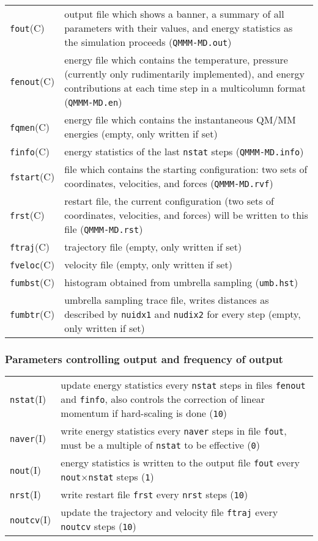 \documentclass[12pt,a4paper]{article}
\newcommand{\Option}[1]{\texttt{#1}}
\newcommand{\OptionValue}[1]{\texttt{#1}}
\begin{document}
\begin{tabularx}{\columnwidth}{p{}X}
  \Option{fout}(C) & output file which shows a banner, a summary of all
  parameters with their values, and energy statistics as the simulation
  proceeds (\OptionValue{QMMM-MD.out}) \\
  \Option{fenout}(C) & energy file which contains the temperature, pressure
  (currently only rudimentarily implemented), and energy contributions at each
  time step in a multicolumn format
  (\OptionValue{QMMM-MD.en}) \\
  \Option{fqmen}(C) & energy file which contains the instantaneous QM/MM
  energies (empty, only written if set) \\
  \Option{finfo}(C) & energy statistics of the last \Option{nstat} steps
  (\OptionValue{QMMM-MD.info}) \\
  \Option{fstart}(C) & file which contains the starting configuration: two sets
  of coordinates, velocities, and forces (\OptionValue{QMMM-MD.rvf}) \\
  \Option{frst}(C) & restart file, the current configuration (two sets of
  coordinates, velocities, and forces) will be written to this file
  (\OptionValue{QMMM-MD.rst}) \\
  \Option{ftraj}(C) & trajectory file (empty, only written if set) \\
  \Option{fveloc}(C) & velocity file (empty, only written if set) \\
  \Option{fumbst}(C) & histogram obtained from umbrella sampling
  (\OptionValue{umb.hst}) \\
  \Option{fumbtr}(C) & umbrella sampling trace file, writes distances as
  described by \Option{nuidx1} and \Option{nudix2} for every step (empty, only
  written if set) \\
\end{tabularx}


\subsubsection*{Parameters controlling output and frequency of output}

\begin{tabularx}{\columnwidth}{p{}X}
  \Option{nstat}(I) & update energy statistics every \Option{nstat} steps in
  files \Option{fenout} and \Option{finfo}, also controls the correction of
  linear momentum if hard-scaling is done (\OptionValue{10}) \\
  \Option{naver}(I) & write energy statistics every \Option{naver} steps in
  file \Option{fout}, must be a multiple of \Option{nstat} to be effective
  (\OptionValue{0}) \\
  \Option{nout}(I) & energy statistics is written to the output file
  \Option{fout} every \Option{nout}$\times$\Option{nstat} steps
  (\OptionValue{1}) \\
  \Option{nrst}(I) & write restart file \Option{frst} every \Option{nrst} steps
  (\OptionValue{10}) \\
  \Option{noutcv}(I) & update the trajectory and velocity file \Option{ftraj}
  every \Option{noutcv} steps (\OptionValue{10}) \\
\end{tabularx}
\end{document}
